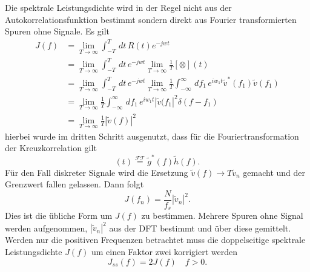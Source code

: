 Die spektrale Leistungsdichte wird in der Regel nicht aus der Autokorrelationsfunktion bestimmt sondern direkt aus Fourier transformierten Spuren ohne Signale.
Es gilt
\begin{align*}
J(f) &= \lim_{T\rightarrow \infty}\int_{-T}^{T}\,dt\, R(t) e^{-jwt} \\
&= \lim_{T\rightarrow \infty}\int_{-T}^{T}\,dt\,e^{-jwt}\lim_{T\rightarrow \infty}\frac{1}{T}[\otimes](t) \\
&= \lim_{T\rightarrow \infty}\int_{-T}^{T}\,dt\,e^{-jwt}\lim_{T\rightarrow \infty}\frac{1}{T} \int_{-\infty}^\infty\,df_1\,e^{iw_1t}\widetilde{v}^*(f_1)\widetilde{v}(f_1)\\
&= \lim_{T\rightarrow \infty}\frac{1}{T}\int_{-\infty}^\infty\,df_1\,e^{iw_1t}|\widetilde{v}(f_1|^2\delta(f-f_1) \\
&= \lim_{T\rightarrow \infty}\frac{1}{T} |\widetilde{v}(f)|^2 
\end{align*}
hierbei wurde im dritten Schritt ausgenutzt, dass für die Fouriertransformation der Kreuzkorrelation gilt
\begin{equation}
[g\otimes h](t) \stackrel{\mathcal{FT}}{=} \widetilde{g}^*(f)\widetilde{h}(f).
\end{equation}
Für den Fall diskreter Signale wird die Ersetzung $\widetilde{v}(f)\rightarrow T\widetilde{v}_n$ gemacht und der Grenzwert fallen gelassen.
Dann folgt
\begin{equation}
J(f_n) = \frac{N}{f_s}|\widetilde{v}_n|^2.
\end{equation}
Dies ist die übliche Form um $J(f)$ zu bestimmen.
Mehrere Spuren ohne Signal werden aufgenommen, $|\widetilde{v}_n|^2$ aus der DFT bestimmt und über diese gemittelt.
Werden nur die positiven Frequenzen betrachtet muss die doppelseitige spektrale Leistungsdichte $J(f)$ um einen Faktor zwei korrigiert werden
\begin{equation}
J_{ss}(f) = 2J(f) \quad f > 0.
\end{equation}

